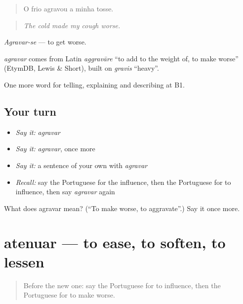 \begin{quote}
O frio agravou a minha tosse.
\end{quote}

\begin{quote}
\emph{The cold made my cough worse.}
\end{quote}

\emph{Agravar-se} — to get worse.

\begin{cousinweb}
\emph{agravar} comes from Latin \emph{aggravāre} \textquotedblleft{}to add to the weight of, to make worse\textquotedblright{} (EtymDB, Lewis \& Short), built on \emph{gravis} \textquotedblleft{}heavy\textquotedblright{}.
\end{cousinweb}

\begin{grammarlens}[title={What you've built}]
One more word for telling, explaining and describing at B1.
\end{grammarlens}

\subsection*{Your turn}
\begin{itemize}
\raggedright
  \item \emph{Say it:} \emph{agravar}
  \item \emph{Say it:} \emph{agravar}, once more
  \item \emph{Say it:} a sentence of your own with \emph{agravar}
  \item \emph{Recall:} say the Portuguese for the influence, then the Portuguese for to influence, then say \emph{agravar} again
\end{itemize}

\begin{tcolorbox}[breakable,colback=teal!4,colframe=teal!35!black,title={Before you move on}]
What does agravar mean? (\textquotedblleft{}To make worse, to aggravate\textquotedblright{}.) Say it once more.
\end{tcolorbox}
\section[atenuar]{atenuar — to ease, to soften, to lessen}

\label{lesson:PT-C354-atenuar}



\begin{quote}
Before the new one: say the Portuguese for to influence, then the Portuguese for to make worse.
\end{quote}


